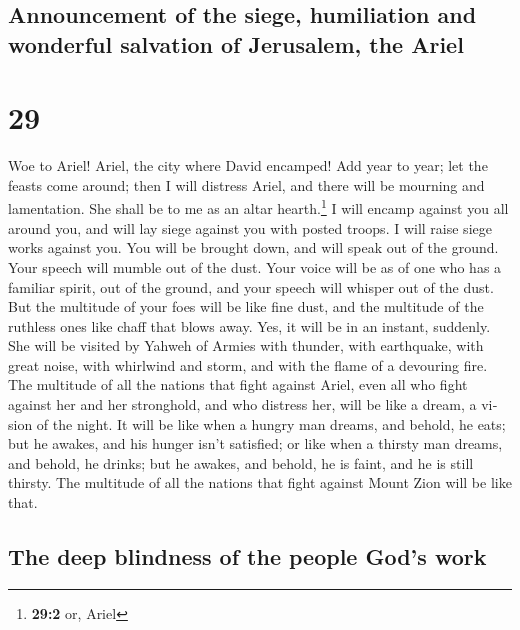 \begin{paracol}{2}
\switchcolumn
\begin{otherlanguage}{english}

\hypertarget{announcement-of-the-siege-humiliation-and-wonderful-salvation-of-jerusalem-the-ariel}{%
\subsection{Announcement of the siege, humiliation and wonderful
salvation of Jerusalem, the
Ariel}\label{announcement-of-the-siege-humiliation-and-wonderful-salvation-of-jerusalem-the-ariel}}

\hypertarget{section-57}{%
\section{29}\label{section-57}}

 Woe to Ariel! Ariel, the city where David encamped! Add
year to year; let the feasts come around;  then I will
distress Ariel, and there will be mourning and lamentation. She shall be
to me as an altar hearth.\footnote{\textbf{29:2} or, Ariel}
 I will encamp against you all around you, and will lay
siege against you with posted troops. I will raise siege works against
you.  You will be brought down, and will speak out of the
ground. Your speech will mumble out of the dust. Your voice will be as
of one who has a familiar spirit, out of the ground, and your speech
will whisper out of the dust.  But the multitude of your
foes will be like fine dust, and the multitude of the ruthless ones like
chaff that blows away. Yes, it will be in an instant, suddenly.
 She will be visited by Yahweh of Armies with thunder,
with earthquake, with great noise, with whirlwind and storm, and with
the flame of a devouring fire.  The multitude of all the
nations that fight against Ariel, even all who fight against her and her
stronghold, and who distress her, will be like a dream, a vision of the
night.  It will be like when a hungry man dreams, and
behold, he eats; but he awakes, and his hunger isn't satisfied; or like
when a thirsty man dreams, and behold, he drinks; but he awakes, and
behold, he is faint, and he is still thirsty. The multitude of all the
nations that fight against Mount Zion will be like that.

\hypertarget{the-deep-blindness-of-the-people-gods-work}{%
\subsection{The deep blindness of the people God's
work}\label{the-deep-blindness-of-the-people-gods-work}}


\end{otherlanguage}
\end{paracol}
